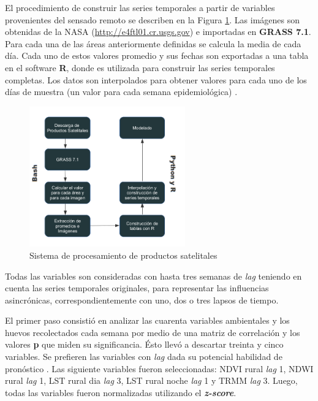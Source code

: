   \par El procedimiento de construir las series temporales a partir de variables
    provenientes del sensado remoto se describen en la Figura \ref{fig:sistema}.
    Las imágenes son obtenidas de la NASA (\url{http://e4ftl01.cr.usgs.gov}) e
    importadas en \textbf{GRASS 7.1}. Para cada una de las áreas anteriormente
    definidas se calcula la media de cada día. Cada uno de estos valores
    promedio y sus fechas son exportadas a una tabla en el software \textbf{R},
    donde es utilizada para construir las series temporales completas.
    Los datos son interpolados para obtener valores para cada uno de los
    días de muestra (un valor para cada semana epidemiológica) \cite{german_temporal}.
    \begin{figure}[hbt]
    \centering%
    \includegraphics[width=0.6\textwidth]{images/sistema}%
    \caption{Sistema de procesamiento de productos satelitales}\label{fig:sistema}
    \end{figure}

  \par Todas las variables son consideradas con hasta tres semanas de \textit{lag}
    teniendo en cuenta las series temporales originales, para representar las
    influencias asincrónicas, correspondientemente con uno, dos o tres
    lapsos de tiempo.

  \par El primer paso consistió en analizar las cuarenta variables ambientales
    y los huevos recolectados cada semana por medio de una matriz de correlación
    y los valores \textbf{p} que miden su significancia. Ésto llevó a descartar
    treinta y cinco variables. Se prefieren las variables con \textit{lag} dada
    su potencial habilidad de pronóstico \cite{german_temporal}. Las siguiente
    variables fueron seleccionadas: NDVI rural \textit{lag} 1,
    NDWI rural \textit{lag} 1, LST rural dia \textit{lag} 3,
    LST rural noche \textit{lag} 1 y TRMM \textit{lag} 3.
    Luego, todas las variables fueron normalizadas utilizando el \textbf{\textit{z-score}}.

